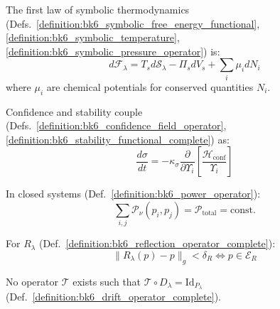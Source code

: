 \begin{axiom}
\label{axiom:bk6_thermodynamic_consistency}
\leavevmode\newline
The first law of symbolic thermodynamics
(Defs.~\ref{definition:bk6_symbolic_free_energy_functional},
\ref{definition:bk6_symbolic_temperature},
\ref{definition:bk6_symbolic_pressure_operator}) is:
\begin{equation}
d\mathcal{F}_\lambda = T_s d\mathcal{S}_\lambda - \Pi_s dV_s + \sum_i \mu_i dN_i
\end{equation}
where $\mu_i$ are chemical potentials for conserved quantities $N_i$.
\end{axiom}

\begin{axiom}
\label{axiom:bk6_confidence_stability_coupling}
Confidence and stability couple (Defs.~\ref{definition:bk6_confidence_field_operator}, \ref{definition:bk6_stability_functional_complete}) as:
\begin{equation}
\frac{d\sigma}{dt} = -\kappa_\sigma \frac{\partial}{\partial \Upsilon_i}\left[\frac{\mathcal{H}_{\text{conf}}}{\Upsilon_i}\right]
\end{equation}
\end{axiom}

\begin{axiom}
\label{axiom:bk6_power_conservation}
In closed systems (Def.~\ref{definition:bk6_power_operator}):
\begin{equation}
\sum_{i,j} \mathcal{P}_\nu(p_i, p_j) = \mathcal{P}_{\text{total}} = \text{const.}
\end{equation}
\end{axiom}

\begin{axiom}
\label{axiom:bk6_reflective_coherence_complete}
For \(R_\lambda\) (Def.~\ref{definition:bk6_reflection_operator_complete}):
\begin{equation}
\|R_\lambda(p) - p\|_g < \delta_R \iff p \in \mathcal{E}_R
\end{equation}
\end{axiom}

\begin{axiom}
\label{axiom:bk6_symbolic_time_irreversibility_complete}
No operator $\mathcal{T}$ exists such that $\mathcal{T} \circ D_\lambda = \text{Id}_{P_{\lambda}}$ (Def.~\ref{definition:bk6_drift_operator_complete}).
\end{axiom}

